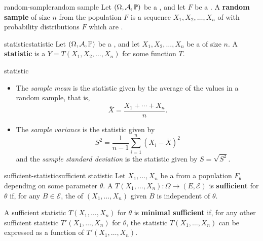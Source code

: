 \begin{topic}{random-sample}{random sample}
    Let $(\Omega, \mathcal{A}, \mathbb{P})$ be a , and let $F$ be a . A \textbf{random sample} of size $n$ from the population $F$ is a sequence $X_1, X_2, \ldots, X_n$ of  with probability distributions $F$ which are .
\end{topic}

\begin{topic}{statistic}{statistic}
    Let $(\Omega, \mathcal{A}, \mathbb{P})$ be a , and let $X_1, X_2, \ldots, X_n$ be a  of size $n$. A \textbf{statistic} is a  $Y = T(X_1, X_2, \ldots, X_n)$ for some function $T$.
\end{topic}

\begin{example}{statistic}
    \begin{itemize}
        \item The \textit{sample mean} is the statistic given by the average of the values in a random sample, that is,
        \[ \overline{X} = \frac{X_1 + \cdots + X_n}{n} . \]
        \item The \textit{sample variance} is the statistic given by
        \[ S^2 = \frac{1}{n - 1} \sum_{i = 1}^{n} (X_i - \overline{X})^2 \]
        and the \textit{sample standard deviation} is the statistic given by $S = \sqrt{S^2}$.
    \end{itemize}
\end{example}

\begin{topic}{sufficient-statistic}{sufficient statistic}
    Let $X_1, \ldots, X_n$ be a  from a population $F_\theta$ depending on some parameter $\theta$. A  $T(X_1, \ldots, X_n) : \Omega \to (E, \mathcal{E})$ is \textbf{sufficient} for $\theta$ if, for any $B \in \mathcal{E}$, the  of $(X_1, \ldots, X_n)$ given $B$ is independent of $\theta$.

    A sufficient statistic $T(X_1, \ldots, X_n)$ for $\theta$ is \textbf{minimal sufficient} if, for any other sufficient statistic $T'(X_1, \ldots, X_n)$ for $\theta$, the statistic $T(X_1, \ldots, X_n)$ can be expressed as a function of $T'(X_1, \ldots, X_n)$.
\end{topic}

